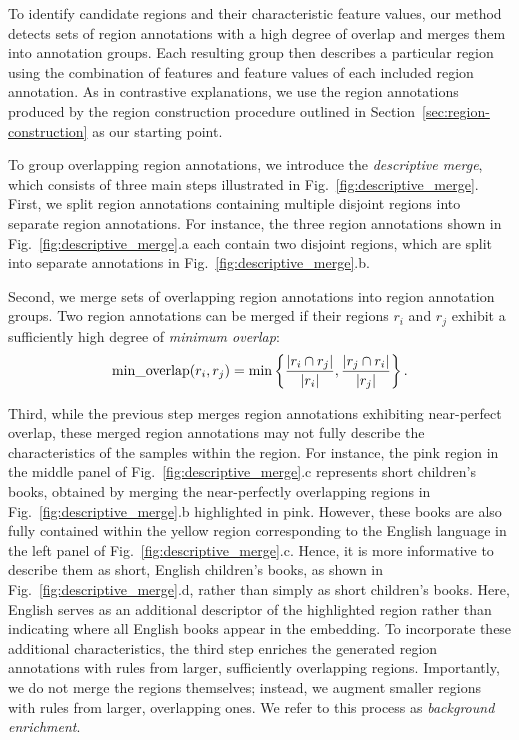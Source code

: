 \documentclass[lettersize,journal]{IEEEtran}
\begin{document}
To identify candidate regions and their characteristic feature values, our method detects sets of region annotations with a high degree of overlap and merges them into annotation groups. Each resulting group then describes a particular region using the combination of features and feature values of each included region annotation.
As in contrastive explanations, we use the region annotations produced by the region construction procedure outlined in Section~\ref{sec:region-construction} as our starting point.

To group overlapping region annotations, we introduce the \textit{descriptive merge}, which consists of three main steps illustrated in Fig.~\ref{fig:descriptive_merge}. First, we split region annotations containing multiple disjoint regions into separate region annotations. For instance, the three region annotations shown in Fig.~\ref{fig:descriptive_merge}.a each contain two disjoint regions, which are split into separate annotations in Fig.~\ref{fig:descriptive_merge}.b.
  
Second, we merge sets of overlapping region annotations into region annotation groups.
Two region annotations can be merged if their regions $r_i$ and $r_j$ exhibit a sufficiently high degree of \textit{minimum overlap}:
\begin{equation}
\text{min\_overlap}(r_i, r_j) = \min \left \{ \frac{|r_i \cap r_j|}{|r_i|}, \frac{|r_j \cap r_i|}{|r_j|} \right \}. \notag
\end{equation}

Third, while the previous step merges region annotations exhibiting near-perfect overlap, these merged region annotations may not fully describe the characteristics of the samples within the region. For instance, the pink region in the middle panel of Fig.~\ref{fig:descriptive_merge}.c represents short children's books, obtained by merging the near-perfectly overlapping regions in Fig.~\ref{fig:descriptive_merge}.b highlighted in pink. However, these books are also fully contained within the yellow region corresponding to the English language in the left panel of Fig.~\ref{fig:descriptive_merge}.c. Hence, it is more informative to describe them as short, English children's books, as shown in Fig.~\ref{fig:descriptive_merge}.d, rather than simply as short children's books.
Here, English serves as an additional descriptor of the highlighted region rather than indicating where all English books appear in the embedding.
To incorporate these additional characteristics, the third step enriches the generated region annotations with rules from larger, sufficiently overlapping regions.
Importantly, we do not merge the regions themselves; instead, we augment smaller regions with rules from larger, overlapping ones.
We refer to this process as \textit{background enrichment}.
\end{document}
